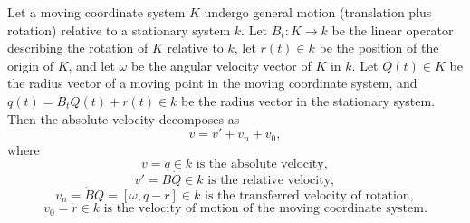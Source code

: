 Let a moving coordinate system $K$ undergo general motion (translation plus rotation) relative to a stationary system $k$. Let $B_t: K \to k$ be the linear operator describing the rotation of $K$ relative to $k$, let $r(t) \in k$ be the position of the origin of $K$, and let $\omega$ be the angular velocity vector of $K$ in $k$. Let $Q(t) \in K$ be the radius vector of a moving point in the moving coordinate system, and $q(t) = B_t Q(t) + r(t) \in k$ be the radius vector in the stationary system. Then the absolute velocity decomposes as
$$
v = v' + v_n + v_0,
$$
where
$$
v = \dot{q} \in k \text{ is the absolute velocity},
$$
$$
v' = B \dot{Q} \in k \text{ is the relative velocity},
$$
$$
v_n = \dot{B} Q = [\omega, q - r] \in k \text{ is the transferred velocity of rotation},
$$
$$
v_0 = \dot{r} \in k \text{ is the velocity of motion of the moving coordinate system}.
$$
